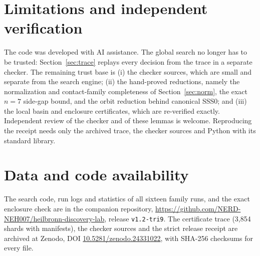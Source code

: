\documentclass[11pt]{amsart}
\begin{document}
\section{Limitations and independent verification}\label{sec:limits}
The code was developed with AI assistance. The global search no longer has to be trusted: Section~\ref{sec:trace} replays every decision from the trace in a separate checker. The remaining trust base is (i) the checker sources, which are small and separate from the search engine; (ii) the hand-proved reductions, namely the normalization and contact-family completeness of Section~\ref{sec:norm}, the exact \(n=7\) side-gap bound, and the orbit reduction behind canonical SSS0; and (iii) the local basin and enclosure certificates, which are re-verified exactly. Independent review of the checker and of these lemmas is welcome. Reproducing the receipt needs only the archived trace, the checker sources and Python with its standard library.

\section*{Data and code availability}
The search code, run logs and statistics of all sixteen family runs, and the exact enclosure check are in the companion repository, \url{https://github.com/NERD-NEH007/heilbronn-discovery-lab}, release \texttt{v1.2-tri9}. The certificate trace (3,854 shards with manifests), the checker sources and the strict release receipt are archived at Zenodo, DOI \href{https://doi.org/10.5281/zenodo.24331022}{10.5281/zenodo.24331022}, with SHA-256 checksums for every file.
\end{document}
